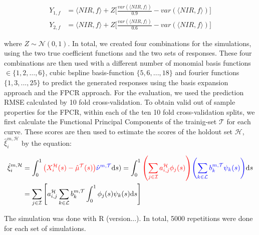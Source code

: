 \documentclass[11pt,twoside,a4paper]{article}
\begin{document}
		\begin{equation}
			\begin{split}
				Y_{1,f} & = \langle NIR, f\rangle + Z  \biggl\lbrack\frac{var(\langle NIR, f\rangle)}{0.9} - var(\langle NIR, f\rangle)\biggr\rbrack \\
				Y_{2,f} & = \langle NIR, f\rangle + Z  \biggl\lbrack\frac{var(\langle NIR, f\rangle)}{0.6} - var(\langle NIR, f\rangle)\biggr\rbrack
			\end{split}
		\end{equation}
		
		where $Z \sim \mathcal{N}(0,1)$. In total, we created four combinations for the simulations, using the two true coefficient functions and the two sets of responses. These four combinations are then used with a different number of monomial basis functions $ \in \{1,2, \dots, 6\}$, cubic bspline basis-function $\{5,6,...,18\}$ and fourier functions $\{1,3,...,25\}$ to predict the generated responses using the basis expansion approach and the FPCR approach. For the evaluation, we used the prediction RMSE calculated by 10 fold cross-validation.
		 To obtain valid out of sample properties for the FPCR, within each of the ten 10 fold cross-validation splits, we first calculate the Functional Principal Components of the trainig-set $\mathcal{T}$ for each curve. These scores are then used to estimate the scores of the holdout set $\mathcal{H}$, $\hat{\xi}_{i}^{m, \mathcal{H}}$  by the equation:
		 
	\begin{equation}
		\begin{split}
			\hat{\xi}_{i}^{m, \mathcal{H}} &=  \int_{0}^{1} {\color{red} \left(X_{i}^{\mathcal{H}}(s) - \hat{\mu}^{\mathcal{T}}(s)\right)} {\color{blue}\hat{\nu}^{m, \mathcal{T}} }\mathrm{d}s) 
						    = \int_{0}^{1} {\color{red}\left(\sum_{j \in \mathcal{I}} a_{i,j}^{\mathcal{H}} \phi_j(s)\right)} {\color{blue}\left(\sum_{k \in \mathcal{L}} b_{k}^{m, \mathcal{T}} \psi_{k}(s)\right)} \mathrm{d}s \\
			 &= \sum_{j \in \mathcal{I}} \left[ a_{i,j}^{\mathcal{H}}\sum_{k \in \mathcal{L}}  b_{k}^{m, \mathcal{T}} \int_{0}^{1} \phi_j(s) \psi_{k}(s)\mathrm{d}s\right]
		\end{split}
	\end{equation}
	\vspace{	0.2cm}
	
	
		 The simulation was done with R (version...). In total, 5000 repetitions were done for each set of simulations. 
		
\end{document}
